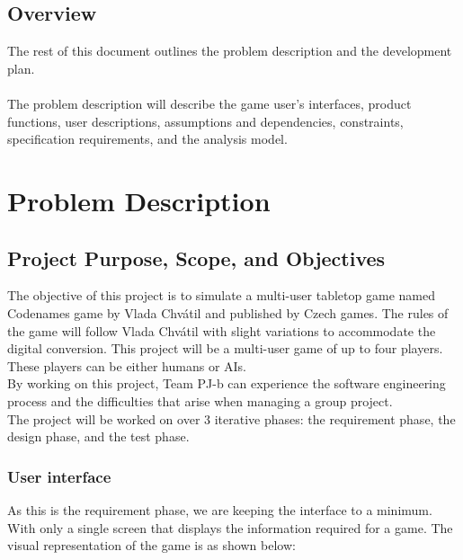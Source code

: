 \documentclass[10pt, a4paper]{article}
\begin{document}
	
	\subsection{Overview}
	
	The rest of this document outlines the problem description and the development plan. \\ 
	\\  
	The problem description will describe the game user's interfaces, product functions, user descriptions, assumptions and dependencies, constraints, specification requirements, and the analysis model. \\  
	
	\clearpage
	
\section{Problem Description}

	\subsection{Project Purpose, Scope, and Objectives}
	
	The objective of this project is to simulate a multi-user tabletop game named Codenames game by Vlada Chv\'atil and published by Czech games. The rules of the game will follow Vlada Chv\'atil with slight variations to accommodate the digital conversion. This project will be a multi-user game of up to four players. These players can be either humans or AIs.\\
	
	By working on this project, Team PJ-b can experience the software engineering process and the difficulties that arise when managing a group project.\\
	
	The project will be worked on over 3 iterative phases: the requirement phase, the design phase, and the test phase.
	
		\subsubsection{User interface}
		
		As this is the requirement phase, we are keeping the interface to a minimum. With only a single screen that displays the information required for a game. The visual representation of the game is as shown below:\\
		
\end{document}
